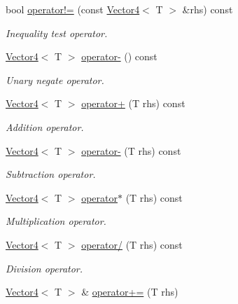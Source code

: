 \begin{DoxyCompactItemize}
bool \hyperlink{class_vector4_ac31d726332dd8505246ca2360c60300d}{operator!=} (const \hyperlink{class_vector4}{Vector4}$<$ T $>$ \&rhs) const 
\begin{DoxyCompactList}\small\item\em Inequality test operator. \item\end{DoxyCompactList}\item 
\hyperlink{class_vector4}{Vector4}$<$ T $>$ \hyperlink{class_vector4_a7bc7d332788658a92b32694969b4d9e3}{operator-\/} () const 
\begin{DoxyCompactList}\small\item\em Unary negate operator. \item\end{DoxyCompactList}\item 
\hyperlink{class_vector4}{Vector4}$<$ T $>$ \hyperlink{class_vector4_a5004bc94b91923c985e23077cfc937a7}{operator+} (T rhs) const 
\begin{DoxyCompactList}\small\item\em Addition operator. \item\end{DoxyCompactList}\item 
\hyperlink{class_vector4}{Vector4}$<$ T $>$ \hyperlink{class_vector4_addd6c83bcdadd34c0038aae76138aebc}{operator-\/} (T rhs) const 
\begin{DoxyCompactList}\small\item\em Subtraction operator. \item\end{DoxyCompactList}\item 
\hyperlink{class_vector4}{Vector4}$<$ T $>$ \hyperlink{class_vector4_a98e56cc3ef735884b8f70e287ff2ed68}{operator$\ast$} (T rhs) const 
\begin{DoxyCompactList}\small\item\em Multiplication operator. \item\end{DoxyCompactList}\item 
\hyperlink{class_vector4}{Vector4}$<$ T $>$ \hyperlink{class_vector4_a512f5d096b767bcbe1618f01d5a2bebf}{operator/} (T rhs) const 
\begin{DoxyCompactList}\small\item\em Division operator. \item\end{DoxyCompactList}\item 
\hyperlink{class_vector4}{Vector4}$<$ T $>$ \& \hyperlink{class_vector4_a7d465ec9eaffaa3308c4a6c64f2ded8f}{operator+=} (T rhs)

\end{DoxyCompactItemize}
